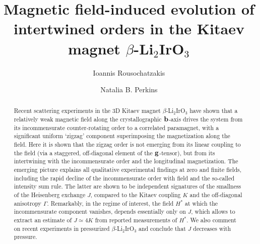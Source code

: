 \documentclass[prx,aps,groupedaddress,twocolumn]{revtex4-1}
\begin{document}
\title{Magnetic field-induced evolution of intertwined orders in the  Kitaev magnet $\beta$-Li$_2$IrO$_3$}

\author{Ioannis Rousochatzakis}

\author{Natalia  B. Perkins}

\begin{abstract}
Recent scattering experiments in the 3D Kitaev magnet $\beta$-Li$_2$IrO$_3$ have shown that a relatively weak magnetic field along the crystallographic ${\bf b}$-axis drives the system from its incommensurate counter-rotating order to a correlated paramagnet, with a significant uniform `zigzag' component superimposing the magnetization along the field. 
%
Here it is shown that the zigzag order is not emerging from its linear coupling to the field (via a staggered, off-diagonal element of the ${\bf g}$-tensor), but from its intertwining with the incommensurate order and the longitudinal magnetization. 
%
The emerging picture explains all qualitative experimental findings at zero and finite fields, including the rapid decline of the incommensurate order with field and the so-called intensity sum rule. 
%
The latter are shown to be independent signatures of the smallness of the Heisenberg exchange $J$, compared to the Kitaev coupling $K$ and the off-diagonal  anisotropy $\Gamma$. 
%
Remarkably, in the regime of interest, the field $H^\ast$ at which the incommensurate component vanishes, depends essentially only on $J$, which allows to extract an estimate of $J\!\simeq\!4K$ from reported measurements of $H^\ast$.
%
We also comment on recent experiments in pressurized $\beta$-Li$_2$IrO$_3$ and conclude that $J$ decreases with pressure.
\end{abstract}
\maketitle

\end{document}
